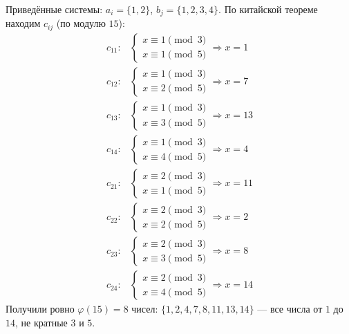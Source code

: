 \documentclass[a4paper,12pt]{article}
\theoremstyle{definition}
\theoremstyle{plain}
\theoremstyle{remark}
\begin{document}
	\begin{tcolorbox}[colback=gray!5, colframe=gray!50, title={Пример для $a=3, b=5$}]
		Приведённые системы: $a_i = \{1,2\}$, $b_j = \{1,2,3,4\}$.
		По китайской теореме находим $c_{ij}$ (по модулю $15$):
		\begin{align*}
			c_{11}: & \begin{cases} x \equiv 1 \pmod{3} \\ x \equiv 1 \pmod{5} \end{cases} \Rightarrow x = 1 \\
			c_{12}: & \begin{cases} x \equiv 1 \pmod{3} \\ x \equiv 2 \pmod{5} \end{cases} \Rightarrow x = 7 \\
			c_{13}: & \begin{cases} x \equiv 1 \pmod{3} \\ x \equiv 3 \pmod{5} \end{cases} \Rightarrow x = 13 \\
			c_{14}: & \begin{cases} x \equiv 1 \pmod{3} \\ x \equiv 4 \pmod{5} \end{cases} \Rightarrow x = 4 \\
			c_{21}: & \begin{cases} x \equiv 2 \pmod{3} \\ x \equiv 1 \pmod{5} \end{cases} \Rightarrow x = 11 \\
			c_{22}: & \begin{cases} x \equiv 2 \pmod{3} \\ x \equiv 2 \pmod{5} \end{cases} \Rightarrow x = 2 \\
			c_{23}: & \begin{cases} x \equiv 2 \pmod{3} \\ x \equiv 3 \pmod{5} \end{cases} \Rightarrow x = 8 \\
			c_{24}: & \begin{cases} x \equiv 2 \pmod{3} \\ x \equiv 4 \pmod{5} \end{cases} \Rightarrow x = 14
		\end{align*}
		Получили ровно $\varphi(15)=8$ чисел: $\{1,2,4,7,8,11,13,14\}$ — все числа от $1$ до $14$, не кратные $3$ и $5$.
	\end{tcolorbox}
	
\end{document}
